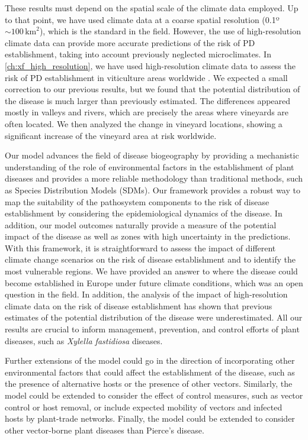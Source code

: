 These results must depend on the spatial scale of the climate data employed. Up
to that point, we have used climate data at a coarse spatial resolution
(0.1º$\sim 100 \, \textrm{km}^2$), which is the standard in the field.
However, the use of high-resolution climate data can provide more accurate
predictions of the risk of PD establishment, taking into account previously
neglected microclimates. In \cref{ch:xf_high_resolution}, we have used
high-resolution climate data to assess the risk of PD establishment in
viticulture areas worldwide \cite{GimenezRomero2024}. We expected a small
correction to our previous results, but we found that the potential
distribution of the disease is much larger than previously estimated. The
differences appeared mostly in valleys and rivers, which are precisely the
areas where vineyards are often located. We then analyzed the change in
vineyard locations, showing a significant increase of the vineyard area at risk
worldwide.

Our model advances the field of disease biogeography by providing a mechanistic
understanding of the role of environmental factors in the establishment of
plant diseases and provides a more reliable methodology than traditional
methods, such as Species Distribution Models (SDMs). Our framework
provides a robust way to map the suitability of the pathosystem components to
the risk of disease establishment by considering the  epidemiological dynamics
of the disease. In addition, our model outcomes naturally provide a measure of
the potential impact of the disease as well as zones with high uncertainty in
the predictions. With this framework, it is straightforward to assess the
impact of different climate change scenarios on the risk of disease
establishment and to identify the most vulnerable regions. We have provided an
answer to where the disease could become established in Europe under future
climate conditions, which was an open question in the field. In addition, the
analysis of the impact of high-resolution climate data on the risk of disease
establishment has shown that previous estimates of the potential distribution
of the disease were underestimated. All our results are crucial to inform
management, prevention, and control efforts of plant diseases, such as
\textit{Xylella fastidiosa} diseases.

Further extensions of the model could go in the direction of incorporating
other environmental factors that could affect the establishment of the disease,
such as the presence of alternative hosts or the presence of other vectors.
Similarly, the model could be extended to consider the effect of control
measures, such as vector control or host removal, or include expected mobility
of vectors and infected hosts by plant-trade networks. Finally, the model could
be extended to consider other vector-borne plant diseases than Pierce's
disease.

